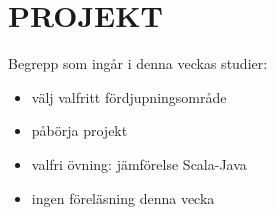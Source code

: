 \chapter{PROJEKT}\label{chapter:W12}
Begrepp som ingår i denna veckas studier:
\begin{itemize}[noitemsep,label={$\square$},leftmargin=*]
\item välj valfritt fördjupningsområde
\item påbörja projekt
\item valfri övning: jämförelse Scala-Java
\item ingen föreläsning denna vecka\end{itemize}
